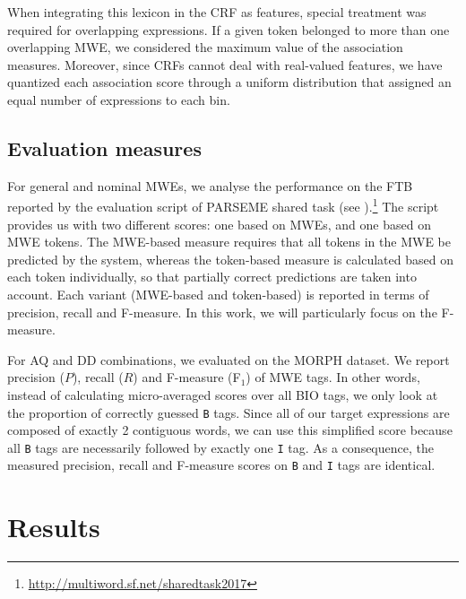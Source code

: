 \documentclass[output=paper,
modfonts
]{langscibook}
\begin{document}
When integrating this lexicon in the CRF as features, special treatment was required for overlapping expressions. If a given token belonged to more than one overlapping MWE, we considered the maximum value of the association measures. Moreover, since CRFs cannot deal with real-valued features, we have quantized each association score through a uniform distribution that assigned an equal number of expressions to each bin.


\subsection{Evaluation measures}
\label{subsec:evalmeas}

For general and nominal MWEs, we analyse the performance on the FTB reported by the evaluation script of PARSEME shared task (see ).\footnote{\url{http://multiword.sf.net/sharedtask2017}} The script provides us with two different scores: one based on MWEs, and one based on MWE tokens. The MWE-based measure requires that all tokens in the MWE be predicted by the system, whereas the token-based measure is calculated based on each token individually, so that partially correct predictions are taken into account. Each variant (MWE-based and token-based) is reported in terms of precision, recall and F-measure. In this work, we will particularly focus on the F-measure. 

For AQ and DD combinations, we evaluated on the MORPH dataset. We report precision ($P$), recall ($R$) and F-measure (F$_1$) of MWE tags. In other words, instead of calculating micro-averaged scores over all BIO tags, we only look at the proportion of correctly guessed \texttt{B} tags.
Since all of our target expressions are composed of exactly 2 contiguous words, we can use this simplified score because all \texttt{B} tags are necessarily followed by exactly one \texttt{I} tag. As a consequence, the measured precision, recall and F-measure scores on \texttt{B} and \texttt{I} tags are identical.

\section{Results}
\label{schol:sec:results}
\end{document}

